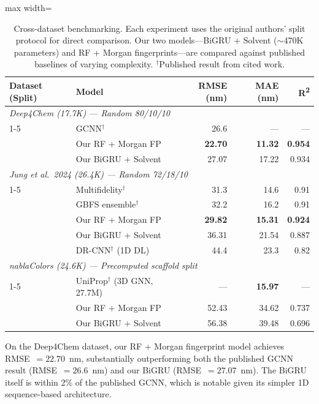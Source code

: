 \documentclass[11pt,a4paper]{article}
\begin{document}
\begin{table}[H]
\centering
\caption{Cross-dataset benchmarking. Each experiment uses the original authors' split protocol for direct comparison. Our two models---BiGRU + Solvent ($\sim$470K parameters) and RF + Morgan fingerprints---are compared against published baselines of varying complexity. $^\dagger$Published result from cited work.}
\label{tab:cross_dataset}
\begin{adjustbox}{max width=\textwidth}
\begin{tabular}{llrrr}
\toprule
\textbf{Dataset (Split)} & \textbf{Model} & \textbf{RMSE (nm)} & \textbf{MAE (nm)} & \textbf{R\textsuperscript{2}} \\
\midrule
\multicolumn{5}{l}{\textit{Deep4Chem (17.7K) --- Random 80/10/10}} \\
\cmidrule(l){1-5}
 & GCNN$^\dagger$ \cite{joungExperimentalDatabaseOptical2020} & 26.6 & --- & --- \\
 & Our RF + Morgan FP & \textbf{22.70} & \textbf{11.32} & \textbf{0.954} \\
 & Our BiGRU + Solvent & 27.07 & 17.22 & 0.934 \\
\midrule
\multicolumn{5}{l}{\textit{Jung et al.\ 2024 (26.4K) --- Random 72/18/10}} \\
\cmidrule(l){1-5}
 & Multifidelity$^\dagger$ \cite{jung2024} & 31.3 & 14.6 & 0.91 \\
 & GBFS ensemble$^\dagger$ \cite{jung2024} & 32.2 & 16.2 & 0.91 \\
 & Our RF + Morgan FP & \textbf{29.82} & \textbf{15.31} & \textbf{0.924} \\
 & Our BiGRU + Solvent & 36.31 & 21.54 & 0.887 \\
 & DR-CNN$^\dagger$ (1D DL) \cite{jung2024} & 44.4 & 23.3 & 0.82 \\
\midrule
\multicolumn{5}{l}{\textit{nablaColors (24.6K) --- Precomputed scaffold split}} \\
\cmidrule(l){1-5}
 & UniProp$^\dagger$ (3D GNN, 27.7M) \cite{potapov2026nablacolors} & --- & \textbf{15.97} & --- \\
 & Our RF + Morgan FP & 52.43 & 34.62 & 0.737 \\
 & Our BiGRU + Solvent & 56.38 & 39.48 & 0.696 \\
\bottomrule
\end{tabular}
\end{adjustbox}
\end{table}

On the Deep4Chem dataset, our RF + Morgan fingerprint model achieves RMSE~$= 22.70$~nm, substantially outperforming both the published GCNN result (RMSE~$= 26.6$~nm) \cite{joungExperimentalDatabaseOptical2020} and our BiGRU (RMSE~$= 27.07$~nm). The BiGRU itself is within 2\% of the published GCNN, which is notable given its simpler 1D sequence-based architecture.
\end{document}
